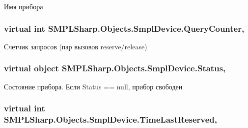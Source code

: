 Имя прибора 

\hypertarget{class_s_m_p_l_sharp_1_1_objects_1_1_smpl_device_a675ca052cc3996e38aec7ccc1dd7ca8c}{
\subsubsection[{Query\-Counter}]{\setlength{\rightskip}{0pt plus 5cm}virtual int S\-M\-P\-L\-Sharp.\-Objects.\-Smpl\-Device.\-Query\-Counter\hspace{0.3cm}{\ttfamily [get]}, {\ttfamily [set]}}}\label{d7/d39/class_s_m_p_l_sharp_1_1_objects_1_1_smpl_device_a675ca052cc3996e38aec7ccc1dd7ca8c}


Счетчик запросов (пар вызовов reserve/release) 

\hypertarget{class_s_m_p_l_sharp_1_1_objects_1_1_smpl_device_a2e79fee0f480adec487fdf013ed52b2a}{
\subsubsection[{Status}]{\setlength{\rightskip}{0pt plus 5cm}virtual object S\-M\-P\-L\-Sharp.\-Objects.\-Smpl\-Device.\-Status\hspace{0.3cm}{\ttfamily [get]}, {\ttfamily [set]}}}\label{d7/d39/class_s_m_p_l_sharp_1_1_objects_1_1_smpl_device_a2e79fee0f480adec487fdf013ed52b2a}


Состояние прибора. Если Status == null, прибор свободен 

\hypertarget{class_s_m_p_l_sharp_1_1_objects_1_1_smpl_device_a8757abb401c1dfa7093ced84f715a2d2}{
\subsubsection[{Time\-Last\-Reserved}]{\setlength{\rightskip}{0pt plus 5cm}virtual int S\-M\-P\-L\-Sharp.\-Objects.\-Smpl\-Device.\-Time\-Last\-Reserved\hspace{0.3cm}{\ttfamily [get]}, {\ttfamily [set]}}}\label{d7/d39/class_s_m_p_l_sharp_1_1_objects_1_1_smpl_device_a8757abb401c1dfa7093ced84f715a2d2}


